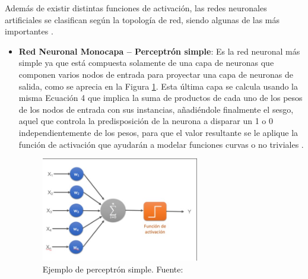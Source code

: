 \begin{itemize}
	Además de existir distintas funciones de activación, las redes neuronales artificiales se clasifican según la topología de red, siendo algunas de las más importantes \parencite{gl_calvo2017clasifrna}.
	
	\begin{itemize}
		\item \textbf{Red Neuronal Monocapa – Perceptrón simple}: Es la red neuronal más simple ya que está compuesta solamente de una capa de neuronas que componen varios nodos de entrada para proyectar una capa de neuronas de salida, como se aprecia en la Figura \ref{2:fig21}. Esta última capa se calcula usando la misma Ecuación 4 que implica la suma de productos de cada uno de los pesos de los nodos de entrada con sus instancias, añadiéndole finalmente el sesgo, aquel que controla la predisposición de la neurona a disparar un 1 o 0 independientemente de los pesos, para que el valor resultante se le aplique la función de activación que ayudarán a modelar funciones curvas o no triviales \parencite{gl_mlfa2019redesneuronales}.
		\begin{figure}[h]
			\begin{center}
				\includegraphics[width=0.65\textwidth]{2/figures/perceptron_simple.jpg}
				\caption{Ejemplo de perceptrón simple. Fuente: \cite{gl_calvo2017clasifrna}}
				\label{2:fig21}
			\end{center}
		\end{figure}
		

\end{itemize}
\end{itemize}
